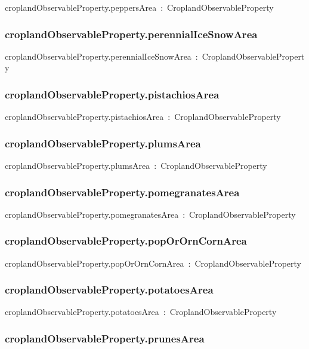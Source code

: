 \documentclass{article}
\begin{document}
croplandObservableProperty.peppersArea~:~CroplandObservableProperty

\subsubsection*{croplandObservableProperty.perennialIceSnowArea}

croplandObservableProperty.perennialIceSnowArea~:~CroplandObservableProperty

\subsubsection*{croplandObservableProperty.pistachiosArea}

croplandObservableProperty.pistachiosArea~:~CroplandObservableProperty

\subsubsection*{croplandObservableProperty.plumsArea}

croplandObservableProperty.plumsArea~:~CroplandObservableProperty

\subsubsection*{croplandObservableProperty.pomegranatesArea}

croplandObservableProperty.pomegranatesArea~:~CroplandObservableProperty

\subsubsection*{croplandObservableProperty.popOrOrnCornArea}

croplandObservableProperty.popOrOrnCornArea~:~CroplandObservableProperty

\subsubsection*{croplandObservableProperty.potatoesArea}

croplandObservableProperty.potatoesArea~:~CroplandObservableProperty

\subsubsection*{croplandObservableProperty.prunesArea}
\end{document}
